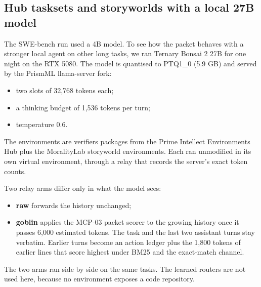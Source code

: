 \subsection{Hub tasksets and storyworlds with a local 27B model}
\label{sec:hub}
The SWE-bench run used a 4B model. To see how the packet behaves with a stronger local agent on other long tasks, we
ran Ternary Bonsai 2 27B for one night on the RTX 5080. The model is quantised to PTQ1\_0 (5.9 GB) and served by the
PrismML llama-server fork:
\begin{itemize}
\item two slots of 32,768 tokens each;
\item a thinking budget of 1,536 tokens per turn;
\item temperature 0.6.
\end{itemize}
The environments are verifiers packages from the Prime Intellect Environments Hub plus the MoralityLab storyworld
environments. Each ran unmodified in its own virtual environment, through a relay that records the server's exact
token counts.

Two relay arms differ only in what the model sees:
\begin{itemize}
\item \textbf{raw} forwards the history unchanged;
\item \textbf{goblin} applies the MCP-03 packet scorer to the growing history once it passes 6,000 estimated tokens. The
task and the last two assistant turns stay verbatim. Earlier turns become an action ledger plus the 1,800 tokens of
earlier lines that score highest under BM25 and the exact-match channel.
\end{itemize}
The two arms ran side by side on the same tasks. The learned routers are not used here, because no environment exposes
a code repository.

